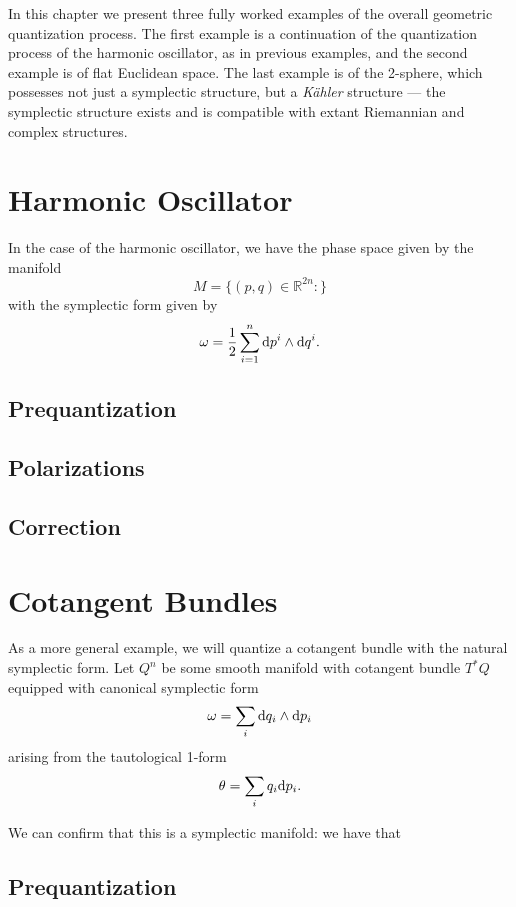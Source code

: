 In this chapter we present three fully worked examples of the overall geometric quantization process. The first example is a continuation of the quantization process of the harmonic oscillator, as in previous examples, and the second example is of flat Euclidean space. The last example is of the 2-sphere, which possesses not just a symplectic structure, but a \emph{K\"{a}hler} structure --- the symplectic structure exists and is compatible with extant Riemannian and complex structures.

\section{Harmonic Oscillator}
In the case of the harmonic oscillator, we have the phase space given by the manifold
$$
M = \{ (p,q) \in \mathbb{R}^{2n}: \}						%
$$
with the symplectic form given by
$$
\omega = \frac{1}{2}\sum_{i=1}^n \d p^i \wedge \d q^i.		%
$$

\subsection{Prequantization}

\subsection{Polarizations}

\subsection{Correction}







\section{Cotangent Bundles}
As a more general example, we will quantize a cotangent bundle with the natural symplectic form. Let $Q^n$ be some smooth manifold with cotangent bundle $T^*Q$ equipped with canonical symplectic form
$$
\omega = \sum_i \mathrm{d} q_i \wedge \mathrm{d} p_i
$$
arising from the tautological 1-form
$$
\theta = \sum_i q_i \mathrm{d} p_i.
$$

We can confirm that this is a symplectic manifold: we have that %

\subsection{Prequantization}

